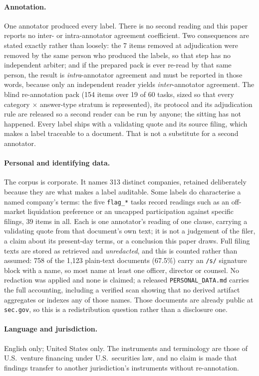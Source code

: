 \paragraph{Annotation.} One annotator produced every label. There is no second reading and this
paper reports no inter- or intra-annotator agreement coefficient. Two consequences are stated exactly
rather than loosely: the 7 items removed at adjudication were removed by the same person who produced
the labels, so that step has no independent arbiter; and if the prepared pack is ever re-read by that
same person, the result is \emph{intra}-annotator agreement and must be reported in those words,
because only an independent reader yields \emph{inter}-annotator agreement. The blind re-annotation pack
(154 items over 19 of 60 tasks, sized so that every category $\times$ answer-type stratum is
represented), its protocol and its adjudication rule are released so a second reader can be run by
anyone; the sitting has not happened. Every label ships with a validating quote and its source
filing, which makes a label traceable to a document. That is not a substitute for a second annotator.

\paragraph{Personal and identifying data.} The corpus is corporate. It names 313 distinct companies,
retained deliberately because they are what makes a label auditable. Some labels do characterise a
named company's terms: the five \texttt{flag\_*} tasks record readings such as an off-market
liquidation preference or an uncapped participation against specific filings, 39 items in all. Each is one
annotator's reading of one clause, carrying a validating quote from that document's own text; it is
not a judgement of the filer, a claim about its present-day terms, or a conclusion this paper draws. Full filing texts are stored as
retrieved and \emph{unredacted}, and this is counted rather than assumed: 758 of the 1{,}123 plain-text
documents (67.5\%) carry an \texttt{/s/} signature block with a name, so most name at least one officer,
director or counsel. No redaction was applied and none is claimed; a released
\texttt{PERSONAL\_DATA.md} carries the full accounting, including a verified scan showing that no
derived artifact aggregates or indexes any of those names. Those documents are
already public at \texttt{sec.gov}, so this is a redistribution question rather than a disclosure
one.

\paragraph{Language and jurisdiction.} English only; United States only. The instruments and
terminology are those of U.S.\ venture financing under U.S.\ securities law, and no claim is made
that findings transfer to another jurisdiction's instruments without re-annotation.

